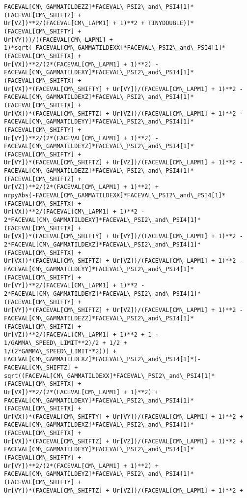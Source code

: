 \documentclass[landscape,letterpaper,10pt,english]{article}
\begin{document}
\begin{Verbatim}[commandchars=\\\{\}]
FACEVAL[CM\_GAMMATILDEZZ]*FACEVAL\_PSI2\_and\_PSI4[1]*(FACEVAL[CM\_SHIFTZ] +
Ur[VZ])**2/(FACEVAL[CM\_LAPM1] + 1)**2 + TINYDOUBLE))*(FACEVAL[CM\_SHIFTY] +
Ur[VY]))/((FACEVAL[CM\_LAPM1] +
1)*sqrt(-FACEVAL[CM\_GAMMATILDEXX]*FACEVAL\_PSI2\_and\_PSI4[1]*(FACEVAL[CM\_SHIFTX] +
Ur[VX])**2/(2*(FACEVAL[CM\_LAPM1] + 1)**2) -
FACEVAL[CM\_GAMMATILDEXY]*FACEVAL\_PSI2\_and\_PSI4[1]*(FACEVAL[CM\_SHIFTX] +
Ur[VX])*(FACEVAL[CM\_SHIFTY] + Ur[VY])/(FACEVAL[CM\_LAPM1] + 1)**2 -
FACEVAL[CM\_GAMMATILDEXZ]*FACEVAL\_PSI2\_and\_PSI4[1]*(FACEVAL[CM\_SHIFTX] +
Ur[VX])*(FACEVAL[CM\_SHIFTZ] + Ur[VZ])/(FACEVAL[CM\_LAPM1] + 1)**2 -
FACEVAL[CM\_GAMMATILDEYY]*FACEVAL\_PSI2\_and\_PSI4[1]*(FACEVAL[CM\_SHIFTY] +
Ur[VY])**2/(2*(FACEVAL[CM\_LAPM1] + 1)**2) -
FACEVAL[CM\_GAMMATILDEYZ]*FACEVAL\_PSI2\_and\_PSI4[1]*(FACEVAL[CM\_SHIFTY] +
Ur[VY])*(FACEVAL[CM\_SHIFTZ] + Ur[VZ])/(FACEVAL[CM\_LAPM1] + 1)**2 -
FACEVAL[CM\_GAMMATILDEZZ]*FACEVAL\_PSI2\_and\_PSI4[1]*(FACEVAL[CM\_SHIFTZ] +
Ur[VZ])**2/(2*(FACEVAL[CM\_LAPM1] + 1)**2) +
nrpyAbs(-FACEVAL[CM\_GAMMATILDEXX]*FACEVAL\_PSI2\_and\_PSI4[1]*(FACEVAL[CM\_SHIFTX] +
Ur[VX])**2/(FACEVAL[CM\_LAPM1] + 1)**2 -
2*FACEVAL[CM\_GAMMATILDEXY]*FACEVAL\_PSI2\_and\_PSI4[1]*(FACEVAL[CM\_SHIFTX] +
Ur[VX])*(FACEVAL[CM\_SHIFTY] + Ur[VY])/(FACEVAL[CM\_LAPM1] + 1)**2 -
2*FACEVAL[CM\_GAMMATILDEXZ]*FACEVAL\_PSI2\_and\_PSI4[1]*(FACEVAL[CM\_SHIFTX] +
Ur[VX])*(FACEVAL[CM\_SHIFTZ] + Ur[VZ])/(FACEVAL[CM\_LAPM1] + 1)**2 -
FACEVAL[CM\_GAMMATILDEYY]*FACEVAL\_PSI2\_and\_PSI4[1]*(FACEVAL[CM\_SHIFTY] +
Ur[VY])**2/(FACEVAL[CM\_LAPM1] + 1)**2 -
2*FACEVAL[CM\_GAMMATILDEYZ]*FACEVAL\_PSI2\_and\_PSI4[1]*(FACEVAL[CM\_SHIFTY] +
Ur[VY])*(FACEVAL[CM\_SHIFTZ] + Ur[VZ])/(FACEVAL[CM\_LAPM1] + 1)**2 -
FACEVAL[CM\_GAMMATILDEZZ]*FACEVAL\_PSI2\_and\_PSI4[1]*(FACEVAL[CM\_SHIFTZ] +
Ur[VZ])**2/(FACEVAL[CM\_LAPM1] + 1)**2 + 1 - 1/GAMMA\_SPEED\_LIMIT**2)/2 + 1/2 +
1/(2*GAMMA\_SPEED\_LIMIT**2))) +
FACEVAL[CM\_GAMMATILDEXZ]*FACEVAL\_PSI2\_and\_PSI4[1]*(-FACEVAL[CM\_SHIFTZ] +
sqrt((FACEVAL[CM\_GAMMATILDEXX]*FACEVAL\_PSI2\_and\_PSI4[1]*(FACEVAL[CM\_SHIFTX] +
Ur[VX])**2/(2*(FACEVAL[CM\_LAPM1] + 1)**2) +
FACEVAL[CM\_GAMMATILDEXY]*FACEVAL\_PSI2\_and\_PSI4[1]*(FACEVAL[CM\_SHIFTX] +
Ur[VX])*(FACEVAL[CM\_SHIFTY] + Ur[VY])/(FACEVAL[CM\_LAPM1] + 1)**2 +
FACEVAL[CM\_GAMMATILDEXZ]*FACEVAL\_PSI2\_and\_PSI4[1]*(FACEVAL[CM\_SHIFTX] +
Ur[VX])*(FACEVAL[CM\_SHIFTZ] + Ur[VZ])/(FACEVAL[CM\_LAPM1] + 1)**2 +
FACEVAL[CM\_GAMMATILDEYY]*FACEVAL\_PSI2\_and\_PSI4[1]*(FACEVAL[CM\_SHIFTY] +
Ur[VY])**2/(2*(FACEVAL[CM\_LAPM1] + 1)**2) +
FACEVAL[CM\_GAMMATILDEYZ]*FACEVAL\_PSI2\_and\_PSI4[1]*(FACEVAL[CM\_SHIFTY] +
Ur[VY])*(FACEVAL[CM\_SHIFTZ] + Ur[VZ])/(FACEVAL[CM\_LAPM1] + 1)**2 +

\end{Verbatim}
\end{document}
